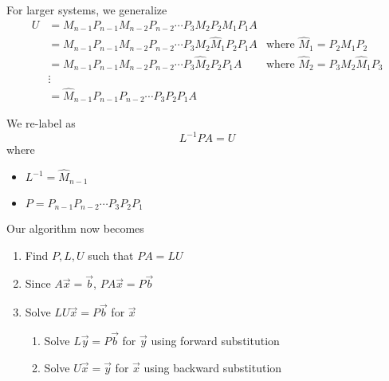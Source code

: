 For larger systems, we generalize
\begin{align*}
    U
     &
    = M_{n-1} P_{n-1} M_{n-2} P_{n-2} \cdots P_3 M_2 P_2 M_1 P_1 A
    \\
     &
    = M_{n-1} P_{n-1} M_{n-2} P_{n-2} \cdots P_3 M_2 \hat{M}_1 P_2 P_1 A
     & \text{where } \hat{M}_1 = P_2 M_1 P_2
    \\
     &
    = M_{n-1} P_{n-1} M_{n-2} P_{n-2} \cdots P_3 \hat{M}_2 P_2 P_1 A
     & \text{where } \hat{M}_2 = P_3 M_2 \hat{M}_1 P_3
    \\
     & \vdots
    \\
     &
    = \hat{M}_{n-1} P_{n-1} P_{n-2} \cdots P_3 P_2 P_1 A
\end{align*}

We re-label as \[
    L^{-1} P A = U
\] where
\begin{itemize}
    \item \( L^{-1} = \hat{M}_{n-1} \)
    \item \( P = P_{n-1} P_{n-2} \cdots P_3 P_2 P_1 \)
\end{itemize}

Our algorithm now becomes

\begin{enumerate}
    \item Find \( P, L, U \) such that \( PA = LU \)
    \item Since \( A \vec{x} = \vec{b} \), \( P A \vec{x} = P \vec{b} \)
    \item Solve \( LU \vec{x} = P \vec{b} \) for \( \vec{x} \)
          \begin{enumerate}
              \item Solve \( L \vec{y} = P \vec{b} \) for \( \vec{y} \) using forward substitution
              \item Solve \( U \vec{x} = \vec{y} \) for \( \vec{x} \) using backward substitution
          \end{enumerate}
\end{enumerate}

